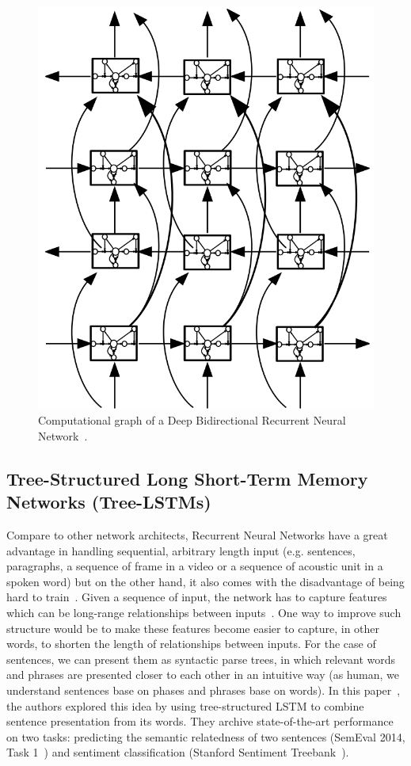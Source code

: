\begin{figure}[H]
    \centering
    \includegraphics[scale=0.4]{figure/dblstm}
    \caption[Deep Bidirectional Recurrent Neural Network]{Computational graph of a Deep Bidirectional Recurrent Neural Network~\cite{GravesLSTM}.}
    \label{fig:dblstm}
\end{figure}

\subsection{Tree-Structured Long Short-Term Memory Networks (Tree-LSTMs)}\label{sec:treelstm}
Compare to other network architects, Recurrent Neural Networks have a great advantage in handling sequential, arbitrary length input (e.g. sentences, paragraphs, a sequence of frame in a video or a sequence of acoustic unit in a spoken word) but on the other hand, it also comes with the disadvantage of being hard to train~\cite{hardRNN}.
Given a sequence of input, the network has to capture features which can be long-range relationships between inputs~\cite{socher2013recursive}.
One way to improve such structure would be to make these features become easier to capture, in other words, to shorten the length of relationships between inputs.
For the case of sentences, we can present them as syntactic parse trees, in which relevant words and phrases are presented closer to each other in an intuitive way (as human, we understand sentences base on phases and phrases base on words). 
In this paper~\cite{treeLSTM}, the authors explored this idea by using tree-structured LSTM to combine sentence presentation from its words.
They archive state-of-the-art performance on two tasks: predicting the semantic relatedness of two sentences (SemEval 2014, Task 1~\cite{SemeEvalTask1}) and sentiment classification (Stanford Sentiment Treebank~\cite{socher2013recursive}).


